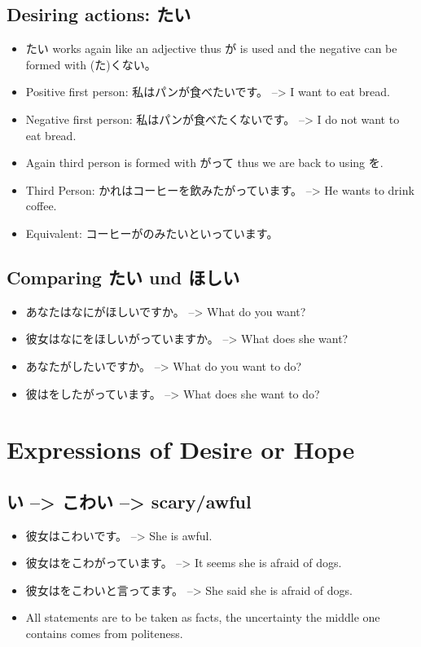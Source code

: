 \documentclass{article}
\begin{document}
\subsection{Desiring actions: たい}
\begin{itemize}
\item たい works again like an adjective thus が is used and the negative can be formed with (た)くない。
\item Positive first person: 私はパンが食べたいです。 --> I want to eat bread.
\item Negative first person: 私はパンが食べたくないです。 --> I do not want to eat bread. \\
\item Again third person is formed with がって thus we are back to using を.
\item Third Person: かれはコーヒーを飲みたがっています。 --> He wants to drink coffee.
\item Equivalent: コーヒーがのみたいといっています。
\end{itemize}
\subsection{Comparing たい und ほしい}
\begin{itemize}
\item あなたはなにがほしいですか。 --> What do you want?
\item 彼女はなにをほしいがっていますか。 --> What does she want?
\item あなたがしたいですか。 --> What do you want to do?
\item 彼はをしたがっています。 --> What does she want to do?
\end{itemize}
\section{Expressions of Desire or Hope}
\subsection{い --> こわい --> scary/awful }
\begin{itemize}
\item 彼女はこわいです。 --> She is awful.
\item 彼女はをこわがっています。 --> It seems she is afraid of dogs.
\item 彼女はをこわいと言ってます。 --> She said she is afraid of dogs.
\item All statements are to be taken as facts, the uncertainty the middle one contains comes from politeness.
\end{itemize}
\end{document}

